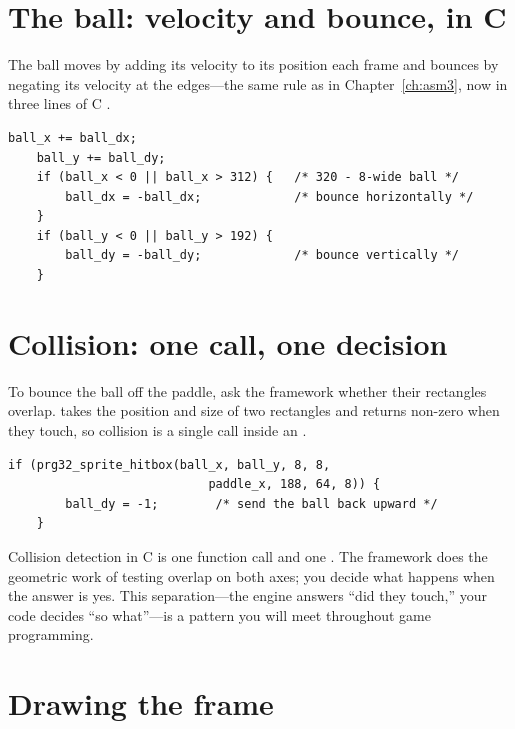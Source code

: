 \section{The ball: velocity and bounce, in C}

The ball moves by adding its velocity to its position each frame and bounces by
negating its velocity at the edges---the same rule as in
Chapter~\ref{ch:asm3}, now in three lines of C \citep{prg32repo}.

\begin{lstlisting}[style=c,caption={Ball motion and edge bounce. Adding velocity moves the ball; negating it at the boundary turns it around.}]
    ball_x += ball_dx;
    ball_y += ball_dy;
    if (ball_x < 0 || ball_x > 312) {   /* 320 - 8-wide ball */
        ball_dx = -ball_dx;             /* bounce horizontally */
    }
    if (ball_y < 0 || ball_y > 192) {
        ball_dy = -ball_dy;             /* bounce vertically */
    }
\end{lstlisting}

\section{Collision: one call, one decision}

To bounce the ball off the paddle, ask the framework whether their rectangles
overlap.  takes the position and size of two
rectangles and returns non-zero when they touch, so collision is a single call
inside an  \citep{prg32repo}.

\begin{lstlisting}[style=c,caption={Bouncing the ball off the paddle. The hitbox test returns non-zero on overlap.}]
    if (prg32_sprite_hitbox(ball_x, ball_y, 8, 8,
                            paddle_x, 188, 64, 8)) {
        ball_dy = -1;        /* send the ball back upward */
    }
\end{lstlisting}

\begin{prgconcept}
Collision detection in C is one function call and one . The framework
does the geometric work of testing overlap on both axes; you decide what happens
when the answer is yes. This separation---the engine answers ``did they touch,''
your code decides ``so what''---is a pattern you will meet throughout game
programming.
\end{prgconcept}

\section{Drawing the frame}

